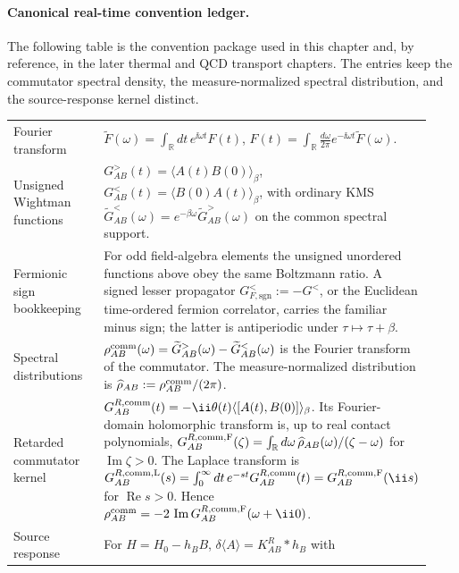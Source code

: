 \paragraph{Canonical real-time convention ledger.}
The following table is the convention package used in this chapter and, by
reference, in the later thermal and QCD transport chapters.  The entries keep
the commutator spectral density, the measure-normalized spectral distribution,
and the source-response kernel distinct.
\begin{center}
\small
\begin{tabular}{@{}>{\raggedright\arraybackslash}p{0.22\linewidth}>{\raggedright\arraybackslash}p{0.71\linewidth}@{}}
Fourier transform &
\(\widetilde F(\omega)=\int_{\mathbb R}dt\,e^{\ii\omega t}F(t)\),
\(F(t)=\int_{\mathbb R}\frac{d\omega}{2\pi}
e^{-\ii\omega t}\widetilde F(\omega)\).\\[0.4em]
Unsigned Wightman functions &
\(G^>_{AB}(t)=\langle A(t)B(0)\rangle_\beta\),
\(G^<_{AB}(t)=\langle B(0)A(t)\rangle_\beta\), with ordinary KMS
\(\widetilde G^<_{AB}(\omega)=e^{-\beta\omega}
\widetilde G^>_{AB}(\omega)\) on the common spectral support.\\[0.4em]
Fermionic sign bookkeeping &
For odd field-algebra elements the unsigned unordered functions above obey the
same Boltzmann ratio.  A signed lesser propagator
\(G^{<}_{F,\mathrm{sgn}}:=-G^<\), or the Euclidean time-ordered fermion
correlator, carries the familiar minus sign; the latter is antiperiodic under
\(\tau\mapsto\tau+\beta\).\\[0.4em]
Spectral distributions &
\(\rho^{\rm comm}_{AB}(\omega)=\widetilde G^>_{AB}(\omega)
-\widetilde G^<_{AB}(\omega)\) is the Fourier transform of the commutator.
The measure-normalized distribution is
\(\widehat\rho_{AB}:=\rho^{\rm comm}_{AB}/(2\pi)\).\\[0.4em]
Retarded commutator kernel &
\(G^{R,\rm comm}_{AB}(t)=-\ii\theta(t)
\langle[A(t),B(0)]\rangle_\beta\).  Its Fourier-domain holomorphic transform is,
up to real contact polynomials,
\(G^{R,\rm comm,F}_{AB}(\zeta)=
\int_{\mathbb R}d\omega\,\widehat\rho_{AB}(\omega)/(\zeta-\omega)\) for
\(\operatorname{Im}\zeta>0\).  The Laplace transform is
\(G^{R,\rm comm,L}_{AB}(s)=\int_0^\infty dt\,e^{-st}
G^{R,\rm comm}_{AB}(t)=G^{R,\rm comm,F}_{AB}(\ii s)\) for
\(\operatorname{Re}s>0\).  Hence
\(\rho^{\rm comm}_{AB}=-2\,\operatorname{Im}G^{R,\rm comm,F}_{AB}(\omega+\ii0)\).\\[0.4em]
Source response &
For \(H=H_0-h_BB\),
\(\delta\langle A\rangle=K^R_{AB}*h_B\) with

\end{tabular}
\end{center}
